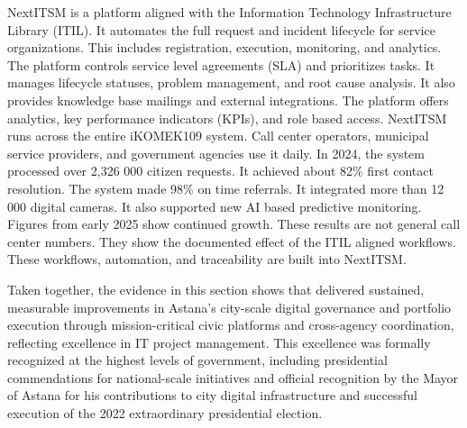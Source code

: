 NextITSM is a platform aligned with the Information Technology Infrastructure Library (ITIL). It automates the full request and incident lifecycle for service organizations. This includes registration, execution, monitoring, and analytics. The platform controls service level agreements (SLA) and prioritizes tasks. It manages lifecycle statuses, problem management, and root cause analysis. It also provides knowledge base mailings and external integrations. The platform offers analytics, key performance indicators (KPIs), and role based access. NextITSM runs across the entire iKOMEK109 system. Call center operators, municipal service providers, and government agencies use it daily. In 2024, the system processed over 2,326 000 citizen requests. It achieved about 82\% first contact resolution. The system made 98\% on time referrals. It integrated more than 12 000 digital cameras. It also supported new AI based predictive monitoring. Figures from early 2025 show continued growth. These results are not general call center numbers. They show the documented effect of the ITIL aligned workflows. These workflows, automation, and traceability are built into NextITSM.


\medskip
Taken together, the evidence in this section shows that \mrl{} delivered sustained, measurable improvements in Astana’s city-scale digital governance and portfolio execution through mission-critical civic platforms and cross-agency coordination, reflecting excellence in IT project management.
This excellence was formally recognized at the highest levels of government, including presidential commendations for national-scale initiatives and official recognition by the Mayor of Astana for his contributions to city digital infrastructure and successful execution of the 2022 extraordinary presidential election.